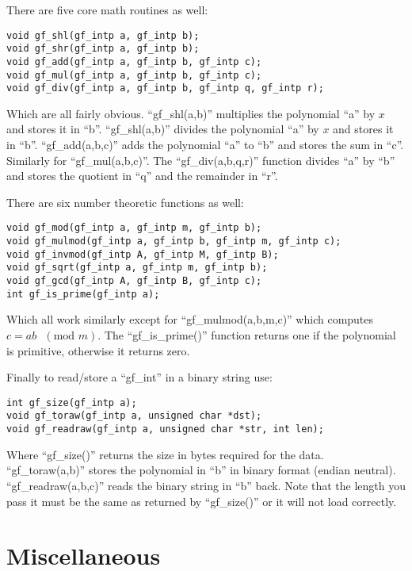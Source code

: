 \documentclass{book}
\begin{document}
There are five core math routines as well:
     
\begin{verbatim}
void gf_shl(gf_intp a, gf_intp b);
void gf_shr(gf_intp a, gf_intp b);
void gf_add(gf_intp a, gf_intp b, gf_intp c);
void gf_mul(gf_intp a, gf_intp b, gf_intp c);
void gf_div(gf_intp a, gf_intp b, gf_intp q, gf_intp r);
\end{verbatim}

Which are all fairly obvious.  ``gf\_shl(a,b)'' multiplies the polynomial ``a'' by $x$ and stores it in ``b''.  
``gf\_shl(a,b)'' divides the polynomial ``a'' by $x$ and stores it in ``b''.  ``gf\_add(a,b,c)'' adds the polynomial
``a'' to ``b'' and stores the sum in ``c''.  Similarly for ``gf\_mul(a,b,c)''.  The ``gf\_div(a,b,q,r)'' function divides
``a'' by ``b'' and stores the quotient in ``q'' and the remainder in ``r''.

There are six number theoretic functions as well:
     
\begin{verbatim}
void gf_mod(gf_intp a, gf_intp m, gf_intp b);
void gf_mulmod(gf_intp a, gf_intp b, gf_intp m, gf_intp c);
void gf_invmod(gf_intp A, gf_intp M, gf_intp B);
void gf_sqrt(gf_intp a, gf_intp m, gf_intp b);
void gf_gcd(gf_intp A, gf_intp B, gf_intp c);
int gf_is_prime(gf_intp a);
\end{verbatim}

Which all work similarly except for  ``gf\_mulmod(a,b,m,c)'' which computes $c = ab\mbox{ }(\mbox{mod }m)$.  The 
``gf\_is\_prime()'' function returns one if the polynomial is primitive, otherwise it returns zero.

Finally to read/store a ``gf\_int'' in a binary string use:
   
\begin{verbatim}
int gf_size(gf_intp a);
void gf_toraw(gf_intp a, unsigned char *dst);
void gf_readraw(gf_intp a, unsigned char *str, int len);
\end{verbatim}
Where ``gf\_size()'' returns the size in bytes required for the data.  ``gf\_toraw(a,b)'' stores the polynomial in ``b''
in binary format (endian neutral).  ``gf\_readraw(a,b,c)'' reads the binary string in ``b'' back.  Note that the length 
you pass it must be the same as returned by ``gf\_size()'' or it will not load correctly.

\chapter{Miscellaneous}
\end{document}
